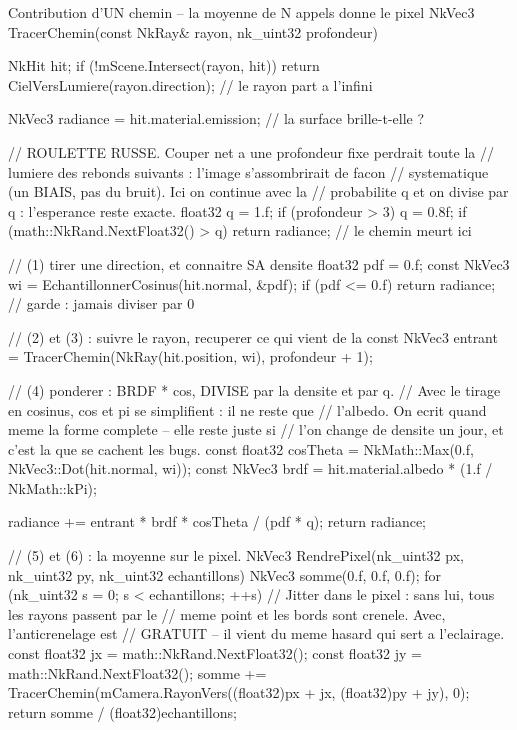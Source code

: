 \begin{nkcode}{Contribution d'UN chemin -- la moyenne de N appels donne le pixel}
NkVec3 TracerChemin(const NkRay& rayon, nk_uint32 profondeur) {
    NkHit hit;
    if (!mScene.Intersect(rayon, hit))
        return CielVersLumiere(rayon.direction);   // le rayon part a l'infini

    NkVec3 radiance = hit.material.emission;       // la surface brille-t-elle ?

    // ROULETTE RUSSE. Couper net a une profondeur fixe perdrait toute la
    // lumiere des rebonds suivants : l'image s'assombrirait de facon
    // systematique (un BIAIS, pas du bruit). Ici on continue avec la
    // probabilite q et on divise par q : l'esperance reste exacte.
    float32 q = 1.f;
    if (profondeur > 3) {
        q = 0.8f;
        if (math::NkRand.NextFloat32() > q)
            return radiance;                       // le chemin meurt ici
    }

    // (1) tirer une direction, et connaitre SA densite
    float32 pdf = 0.f;
    const NkVec3 wi = EchantillonnerCosinus(hit.normal, &pdf);
    if (pdf <= 0.f)
        return radiance;                           // garde : jamais diviser par 0

    // (2) et (3) : suivre le rayon, recuperer ce qui vient de la
    const NkVec3 entrant = TracerChemin(NkRay(hit.position, wi), profondeur + 1);

    // (4) ponderer : BRDF * cos, DIVISE par la densite et par q.
    // Avec le tirage en cosinus, cos et pi se simplifient : il ne reste que
    // l'albedo. On ecrit quand meme la forme complete -- elle reste juste si
    // l'on change de densite un jour, et c'est la que se cachent les bugs.
    const float32 cosTheta = NkMath::Max(0.f, NkVec3::Dot(hit.normal, wi));
    const NkVec3 brdf = hit.material.albedo * (1.f / NkMath::kPi);

    radiance += entrant * brdf * cosTheta / (pdf * q);
    return radiance;
}

// (5) et (6) : la moyenne sur le pixel.
NkVec3 RendrePixel(nk_uint32 px, nk_uint32 py, nk_uint32 echantillons) {
    NkVec3 somme(0.f, 0.f, 0.f);
    for (nk_uint32 s = 0; s < echantillons; ++s) {
        // Jitter dans le pixel : sans lui, tous les rayons passent par le
        // meme point et les bords sont crenele. Avec, l'anticrenelage est
        // GRATUIT -- il vient du meme hasard qui sert a l'eclairage.
        const float32 jx = math::NkRand.NextFloat32();
        const float32 jy = math::NkRand.NextFloat32();
        somme += TracerChemin(mCamera.RayonVers((float32)px + jx, (float32)py + jy), 0);
    }
    return somme / (float32)echantillons;
}
\end{nkcode}

